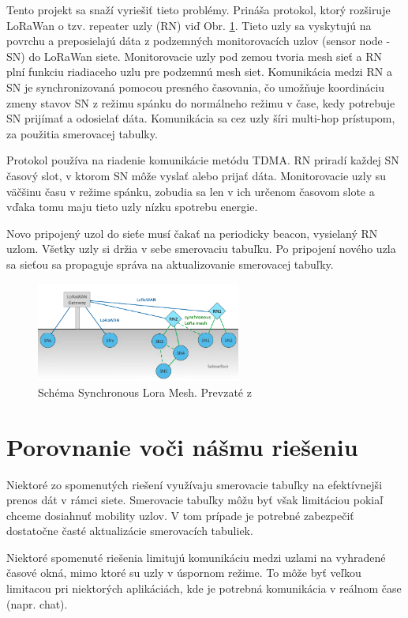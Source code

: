 \documentclass[slovak,master]{diploma}
\begin{document}
Tento projekt sa snaží vyriešiť tieto problémy. Prináša protokol, ktorý rozširuje LoRaWan o tzv. repeater uzly (RN) viď Obr. \ref{fig:synchronouslora}. Tieto uzly sa vyskytujú na povrchu a preposielajú dáta z 
podzemných monitorovacích uzlov (sensor node  - SN) do LoRaWan siete. Monitorovacie uzly pod zemou tvoria mesh sieť a RN plní funkciu riadiaceho uzlu pre podzemnú mesh siet. 
Komunikácia medzi RN a SN je synchronizovaná pomocou presného časovania, čo umožňuje koordináciu zmeny stavov SN z režimu spánku do normálneho režimu v čase, kedy 
potrebuje SN prijímať a odosielať dáta. Komunikácia sa cez uzly šíri multi-hop prístupom, za použitia smerovacej tabulky.

Protokol používa na riadenie komunikácie metódu TDMA. RN priradí každej SN časový slot, v ktorom SN môže vyslať alebo prijať dáta.
Monitorovacie uzly su väčšinu času v režime spánku, zobudia sa len v ich určenom časovom slote a vďaka tomu maju tieto uzly nízku spotrebu energie.

Novo pripojený uzol do sieťe musí čakať na periodicky beacon, vysielaný RN uzlom. Všetky uzly si držia v sebe smerovaciu tabuľku. Po pripojení nového uzla sa sieťou sa propaguje 
správa na aktualizovanie smerovacej tabuľky.

\begin{figure}
	\centering
	\includegraphics[width=0.6\textwidth]{Figures/synchronouslorameshnetwork.png}
	\caption{Schéma Synchronous Lora Mesh. Prevzaté z \cite{synchronouslorameshnetwork}}
	\label{fig:synchronouslora}
\end{figure}

\section{Porovnanie voči nášmu riešeniu}
Niektoré zo spomenutých riešení využívaju smerovacie tabuľky na efektívnejši prenos dát v rámci siete. Smerovacie tabuľky môžu byť však limitáciou pokiaľ 
chceme dosiahnuť mobility uzlov. V tom prípade je potrebné zabezpečiť dostatočne časté aktualizácie smerovacích tabuliek.

Niektoré spomenuté riešenia limitujú komunikáciu medzi uzlami na vyhradené časové okná, mimo ktoré su uzly v úspornom režime. To môže byť 
veľkou limitacou pri niektorých aplikáciách, kde je potrebná komunikácia v reálnom čase  (napr. chat).
\end{document}
